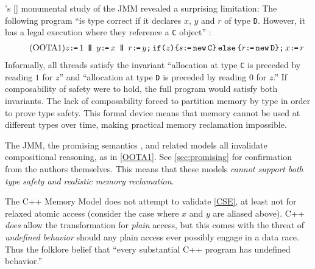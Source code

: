 \citeauthor{DBLP:journals/toplas/Lochbihler13}'s
[\citeyear{DBLP:journals/toplas/Lochbihler13}] monumental study of the JMM
revealed a surprising limitation: The following program ``is type correct if
it declares $x$, $y$ and $r$ of type \texttt{D}. However, it has a legal
execution where they reference a \texttt{C} object''
\citep[Fig.~8]{DBLP:journals/toplas/Lochbihler13}:
\begin{gather}
  \taglabel{OOTA1}
  z \GETS 1
  \PAR %
  y\GETS x
  \PAR
  \aReg\GETS y \SEMI \IF{z} \THEN \bReg \GETS \NEW \texttt{C} \ELSE \aReg \GETS \NEW \texttt{D} \FI  \SEMI x \GETS \aReg 
\end{gather}
Informally, all threads satisfy the invariant ``allocation at type \texttt{C}
is preceded by reading $1$ for $z$'' and ``allocation at type \texttt{D} is
preceded by reading $0$ for $z$.''  If composability of safety were to hold,
the full program would satisfy both invariants.  The lack of composability
forced \citeauthor{DBLP:journals/toplas/Lochbihler13} to partition memory by
type in order to prove type safety.  This formal device means that memory
cannot be used at different types over time, making practical memory
reclamation impossible.


The JMM, the promising semantics \cite{DBLP:conf/popl/KangHLVD17}, and
related models
\citep{DBLP:conf/esop/JagadeesanPR10,DBLP:journals/pacmpl/ChakrabortyV19} all
invalidate compositional reasoning, as in \ref{OOTA1}.  See
\textsection\ref{sec:promising} for confirmation from the authors themselves.
This means that these models \emph{cannot support both type safety and
  realistic memory reclamation}.


The C++ Memory Model \cite{Batty:2011:MCC:1926385.1926394} does not attempt
to validate \ref{CSE}, at least not for relaxed atomic access (consider the
case where $x$ and $y$ are aliased above).  C++ \emph{does} allow the
transformation for \emph{plain} access, but this comes with the threat of
\emph{undefined behavior} should any plain access ever possibly engage in a
data race.  Thus the folklore belief that ``every substantial C++ program has
undefined behavior.''


